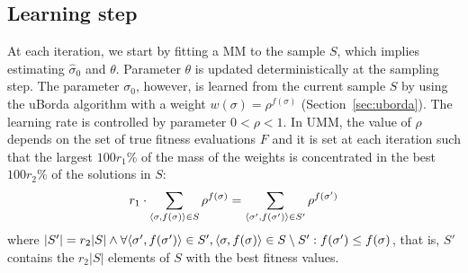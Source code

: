 \documentclass[sigconf,dvipsnames]{acmart}
\begin{document}




\newcommand{\Edist}{\ensuremath{\mathbb{E}[D]}}


\subsection{Learning step}
%
At each iteration, we start by fitting a MM to the sample $S$, which implies
estimating $\hat\sigma_0$ and $\theta$. Parameter $\theta$ is updated
deterministically at the sampling step.  The parameter $\sigma_0$, however, is
learned from the current sample $S$ by using the uBorda algorithm with a weight
$w(\sigma)=\rho^{f(\sigma)}$ (Section~\ref{sec:uborda}). The learning rate is
controlled by parameter $0 < \rho < 1$. 
In UMM, the value of $\rho$ depends on the set of true fitness evaluations $F$
and it is set at each iteration such that the largest $100r_1$\% of the mass of
the weights is concentrated in the best $100r_2$\% of the solutions in $S$:
%
% 
\begin{equation}
    r_1 \cdot \sum_{\tuple{\sigma,f(\sigma)}\in S}\rho^{f(\sigma)} =  \sum_{\tuple{\sigma', f(\sigma')}\in S'}\rho^{f(\sigma')}  %
\end{equation}
%
where $|S'| = r_2|S| \land \forall \langle \sigma',f(\sigma')\rangle\in S', \langle \sigma,f(\sigma)\rangle\in S\setminus S' : f(\sigma')\leq f(\sigma)$, that is, $S'$ contains the $r_2|S|$ elements of $S$ with the best  fitness values. 
\end{document}

